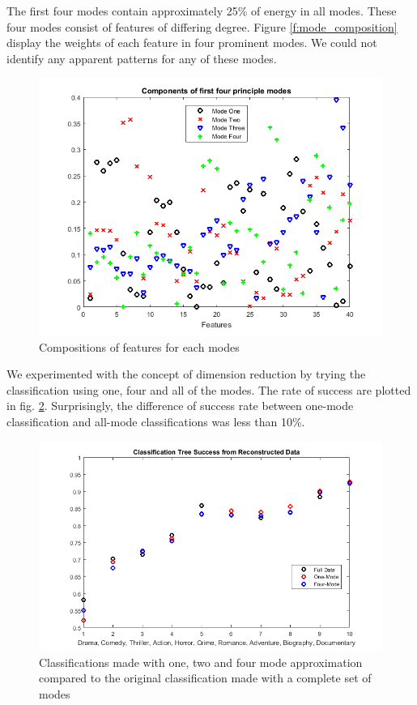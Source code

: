 \documentclass[letterpaper, 10 pt, conference]{ieeeconf}  %
\begin{document}
The first four modes contain approximately 25\% of energy in all modes. These four modes consist of features of differing degree. Figure \ref{f:mode_composition} display the weights of each feature in four prominent modes. We could not identify any apparent patterns for any of these modes.
\begin{figure}[h]
	\centering
	\includegraphics[width=\columnwidth]{principleModes.png}
	\caption{Compositions of features for each modes}
	\label{f:mode_covar}
\end{figure}
We experimented with the concept of dimension reduction by trying the classification using one, four and all of the modes. The rate of success are plotted in fig. \ref{f:modal_redx}. Surprisingly, the difference of success rate between one-mode classification and all-mode classifications was less than 10\%.

\begin{figure}[h]
	\centering
	\includegraphics[width=\columnwidth]{reconstructionSuccess.png}
	\caption{Classifications made with one, two and four mode approximation compared to the original classification made with a complete set of modes} 
	\label{f:modal_redx}
\end{figure}
\end{document}
